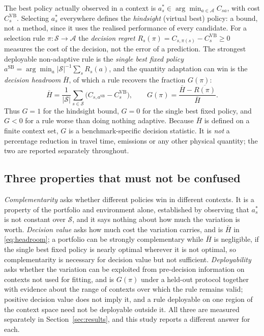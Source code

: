 The best policy actually observed in a context is
$a_s^{*}\in\arg\min_{a\in\mathcal{A}} C_{sa}$, with cost $C_{s}^{\mathrm{VB}}$. Selecting
$a_s^{*}$ everywhere defines the \emph{hindsight} (virtual best) policy: a bound, not a
method, since it uses the realised performance of every candidate. For a selection rule
$\pi:\mathcal{S}\rightarrow\mathcal{A}$ the \emph{decision regret}
$R_s(\pi)=C_{s,\pi(s)}-C^{\mathrm{VB}}_{s}\ge0$ measures the cost of the decision, not the
error of a prediction. The strongest deployable non-adaptive rule is the \emph{single best
fixed policy} $a^{\mathrm{SB}}=\arg\min_{a}|\mathcal{S}|^{-1}\sum_{s}R_s(a)$, and the
quantity adaptation can win is the \emph{decision headroom} $\bar H$, of which a rule
recovers the fraction $G(\pi)$:
\begin{equation}
\bar H=\frac{1}{|\mathcal{S}|}\sum_{s\in\mathcal{S}}
\bigl(C_{s,a^{\mathrm{SB}}}-C^{\mathrm{VB}}_{s}\bigr),
\qquad
G(\pi)=\frac{\bar H-\overline{R(\pi)}}{\bar H} .
\label{eq:headroom}
\end{equation}
Thus $G=1$ for the hindsight bound, $G=0$ for the single best fixed policy, and $G<0$ for
a rule worse than doing nothing adaptive. Because $\bar H$ is defined on a finite context
set, $G$ is a benchmark-specific decision statistic. It is \emph{not} a percentage
reduction in travel time, emissions or any other physical quantity; the two are reported
separately throughout.

\subsection{Three properties that must not be confused}

\emph{Complementarity} asks whether different policies win in different contexts. It is a
property of the portfolio and environment alone, established by observing that $a^{*}_{s}$
is not constant over $\mathcal{S}$, and it says nothing about how much the variation is
worth. \emph{Decision value} asks how much cost the variation carries, and is $\bar H$ in
\eqref{eq:headroom}; a portfolio can be strongly complementary while $\bar H$ is
negligible, if the single best fixed policy is nearly optimal wherever it is not optimal,
so complementarity is necessary for decision value but not sufficient.
\emph{Deployability} asks whether the variation can be exploited from pre-decision
information on contexts not used for fitting, and is $G(\pi)$ under a held-out protocol
together with evidence about the range of contexts over which the rule remains valid;
positive decision value does not imply it, and a rule deployable on one region of the
context space need not be deployable outside it. All three are measured separately in
Section~\ref{sec:results}, and this study reports a different answer for each.
